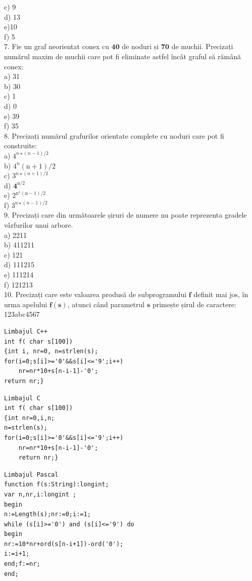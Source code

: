 \documentclass[10pt]{article}
\begin{document}
c) 9\\
d) 13\\
e)10\\
f) 5\\
7. Fie un graf neorientat conex cu $\mathbf{4 0}$ de noduri și $\mathbf{7 0}$ de muchii. Precizați numărul maxim de muchii care pot fi eliminate astfel încât graful să rămână conex:\\
a) 31\\
b) 30\\
c) 1\\
d) 0\\
e) 39\\
f) 35\\
8. Precizați numărul grafurilor orientate complete cu noduri care pot fi construite:\\
a) $4^{n \star(n-1) / 2}$\\
b) $4^{n}(\mathrm{n}+1) / 2$\\
c) $3^{n \star(n+1) / 2}$\\
d) $\mathbf{4}^{\mathrm{n} / 2}$\\
e) $2^{\mathrm{n}^{\star}(\mathrm{n}-1) / 2}$\\
f) $3^{n \star(n-1) / 2}$\\
9. Precizați care din următoarele șiruri de numere nu poate reprezenta gradele vârfurilor unui arbore.\\
a) 2211\\
b) 411211\\
c) 121\\
d) 111215\\
e) 111214\\
f) 121213\\
10. Precizați care este valoarea produsă de subprogramului $\mathbf{f}$ definit mai jos, în urma apelului $\mathbf{f ( s )}$, atunci când parametrul $\mathbf{s}$ primește șirul de caractere: 123abc4567

\begin{verbatim}
Limbajul C++
int f( char s[100])
{int i, nr=0, n=strlen(s);
for(i=0;s[i]>='0'&&s[i]<='9';i++)
    nr=nr*10+s[n-i-1]-'0';
return nr;}
\end{verbatim}

\begin{verbatim}
Limbajul C
int f( char s[100])
{int nr=0,i,n;
n=strlen(s);
for(i=0;s[i]>='0'&&s[i]<='9';i++)
    nr=nr*10+s[n-i-1]-'0';
    return nr;}
\end{verbatim}

\begin{verbatim}
Limbajul Pascal
function f(s:String):longint;
var n,nr,i:longint ;
begin
n:=Length(s);nr:=0;i:=1;
while (s[i]>='0') and (s[i]<='9') do
begin
nr:=10*nr+ord(s[n-i+1])-ord('0');
i:=i+1;
end;f:=nr;
end;
\end{verbatim}
\end{document}
